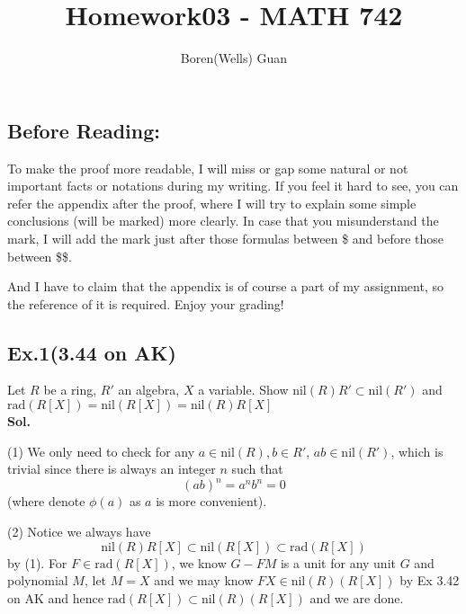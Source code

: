 \documentclass[lang=en,11pt,a4paper,citestyle =authoryear]{elegantpaper}
\title{Homework03 - MATH 742}
\author{Boren(Wells) Guan}
\begin{document}
\maketitle

\subsection*{Before Reading:}\par
To make the proof more readable, I will miss or gap some natural or not important facts or notations during my writing. If you feel it hard to see, you can refer the appendix after the proof, where I will try to explain some simple conclusions (will be marked) more clearly. In case that you misunderstand the mark, I will add the mark just after those formulas between \$ and before those between \$\$.\par
And I have to claim that the appendix is of course a part of my assignment, so the reference of it is required. Enjoy your grading!

\subsection*{Ex.1(3.44 on AK)} 
Let $R$ be a ring, $R'$ an algebra, $X$ a variable. Show $\text{nil}(R)R'\subset \text{nil}(R')$ and $\text{rad}(R[X]) = \text{nil}(R[X]) = \text{nil}(R)R[X]$
\vspace{0.5em}\\
\textbf{Sol.} \par
(1) We only need to check for any $a\in \text{nil}(R),b\in R'$, $ab\in \text{nil}(R')$, which is trivial since there is always an integer $n$ such that
\[
(ab)^n = a^nb^n = 0
\]
(where denote $\phi(a)$ as $a$ is more convenient).\par
(2) Notice we always have
\[
\text{nil}(R)R[X] \subset \text{nil}(R[X]) \subset \text{rad}(R[X])
\]
by (1). For $F\in\text{rad}(R[X])$, we know $G-FM$ is a unit for any unit $G$ and polynomial $M$, let $M = X$ and we may know $FX \in \text{nil}(R)(R[X])$ by Ex 3.42 on AK and hence $\text{rad}(R[X]) \subset \text{nil}(R)(R[X])$ and we are done.
\par 
\vspace{0.5em}
\end{document}
